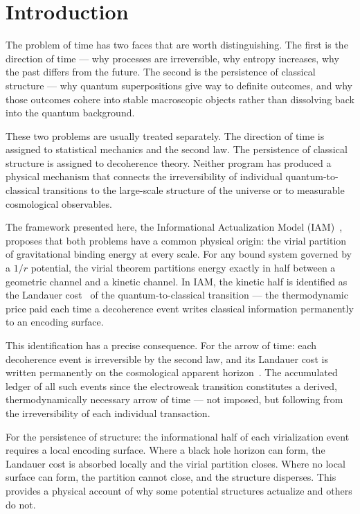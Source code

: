 \documentclass[12pt,a4paper]{article}
\begin{document}
\section{Introduction}
\label{sec:intro}

The problem of time has two faces that are worth distinguishing. The first
is the direction of time --- why processes are irreversible, why entropy
increases, why the past differs from the future. The second is the
persistence of classical structure --- why quantum superpositions give way
to definite outcomes, and why those outcomes cohere into stable macroscopic
objects rather than dissolving back into the quantum background.

These two problems are usually treated separately. The direction of time is
assigned to statistical mechanics and the second law. The persistence of
classical structure is assigned to decoherence theory. Neither program has
produced a physical mechanism that connects the irreversibility of individual
quantum-to-classical transitions to the large-scale structure of the universe
or to measurable cosmological observables.

The framework presented here, the Informational Actualization Model
(IAM)~\citep{IAM_theory,IAM_obs}, proposes that both problems have a common
physical origin: the virial partition of gravitational binding energy at
every scale. For any bound system governed by a $1/r$ potential, the virial
theorem partitions energy exactly in half between a geometric channel and a
kinetic channel. In IAM, the kinetic half is identified as the Landauer
cost~\citep{Landauer1961} of the quantum-to-classical transition --- the
thermodynamic price paid each time a decoherence event writes classical
information permanently to an encoding surface.

This identification has a precise consequence. For the arrow of time:
each decoherence event is irreversible by the second law, and its
Landauer cost is written permanently on the cosmological apparent
horizon~\citep{Jacobson1995,CaiKim2005,Gibbons1977}. The accumulated
ledger of all such events since the electroweak transition constitutes
a derived, thermodynamically necessary arrow of time --- not imposed, but
following from the irreversibility of each individual transaction.

For the persistence of structure: the informational half of each
virialization event requires a local encoding surface. Where a black hole
horizon can form, the Landauer cost is absorbed locally and the virial
partition closes. Where no local surface can form, the partition cannot
close, and the structure disperses. This provides a physical account of
why some potential structures actualize and others do not.
\end{document}
